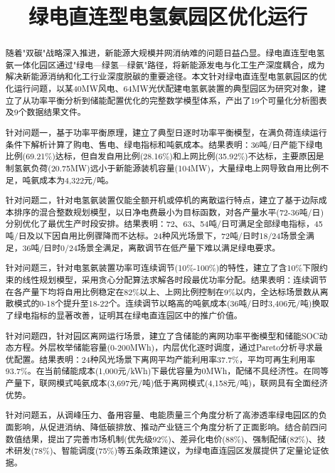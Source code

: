 \documentclass[withoutpreface,bwprint]{cumcmthesis}
\title{绿电直连型电氢氨园区优化运行}
\begin{document}
\maketitle

\begin{abstract}
随着"双碳"战略深入推进，新能源大规模并网消纳难的问题日益凸显。绿电直连型电氢氨一体化园区通过"绿电—绿氢—绿氨"路径，将新能源发电与化工生产深度耦合，成为解决新能源消纳和化工行业深度脱碳的重要途径。本文针对绿电直连型电氢氨园区的优化运行问题，以某40MW风电、64MW光伏配建电氢氨装置的典型园区为研究对象，建立了从功率平衡分析到储能配置优化的完整数学模型体系，产出了19个可量化分析图表及9个数据结果文件。

针对问题一，基于功率平衡原理，建立了典型日逐时功率平衡模型，在满负荷连续运行条件下解析计算了购电、售电、绿电指标和吨氨成本。结果表明：36吨/日产能下绿电比例(69.21\%)达标，但自发自用比例(28.16\%)和上网比例(35.92\%)不达标，主要原因是制氢氨负荷(20.75MW)远小于新能源装机容量(104MW)，大量绿电上网导致自用比例不足，吨氨成本为4,322元/吨。

针对问题二，针对电氢氨装置仅能全额开机或停机的离散运行特点，建立了基于边际成本排序的混合整数规划模型，以日净电费最小为目标函数，对各产量水平(72-36吨/日)分别优化了最优生产时段安排。结果表明：72、63、54吨/日可满足全部绿电指标，45吨/日及以下因自用比例骤降而不达标。24种风光场景下，72吨/日时18/24场景全满足，36吨/日时0/24场景全满足，离散调节在低产量下难以满足绿电要求。

针对问题三，针对电氢氨装置功率可连续调节(10\%-100\%)的特性，建立了含10\%下限约束的线性规划模型，采用贪心分配算法求解各时段最优功率分配。结果表明：连续调节在各产量下均将自用比例稳定在82\%以上、上网比例控制在9\%以内，全达标场景数从离散模式的0-18个提升至18-22个。连续调节以略高的吨氨成本(36吨/日时3,406元/吨)换取了绿电指标的显著改善，证明其在绿电直连园区中的推广价值。

针对问题四，针对园区离网运行场景，建立了含储能的离网功率平衡模型和储能SOC动态方程。外层枚举储能容量(0-200MWh)，内层优化逐时调度，通过Pareto分析寻求最优配置。结果表明：24种风光场景下离网平均产能利用率37.7\%，平均可再生利用率93.7\%。在当前储能成本(1,000元/kWh)下最优容量为0MWh，配储不具经济性。在同等产量下，联网模式吨氨成本(3,697元/吨)低于离网模式(4,158元/吨)，联网具有全面经济优势。

针对问题五，从调峰压力、备用容量、电能质量三个角度分析了高渗透率绿电园区的负面影响，从促进消纳、降低碳排放、推动产业链三个角度分析了正面影响。结合前四问数值结果，提出了完善市场机制(优先级92\%)、差异化电价(88\%)、强制配储(82\%)、技术研发(78\%)、智能调度(75\%)等五条政策建议，为绿电直连园区发展提供了定量论证依据。

\end{abstract}
\end{document}

